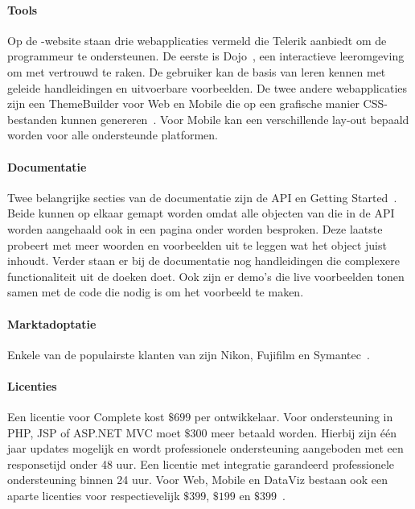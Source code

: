 \paragraph{Tools}
Op de \kendo{}-website staan drie webapplicaties vermeld die Telerik aanbiedt om de programmeur te ondersteunen.
De eerste is \kendo{} Dojo~\cite{Telerika},  een interactieve leeromgeving om met \kendo{} vertrouwd te raken.
De gebruiker kan de basis van \kendo{} leren kennen met geleide handleidingen en uitvoerbare voorbeelden.
De twee andere webapplicaties zijn een ThemeBuilder voor Web en Mobile die op een grafische manier CSS-bestanden kunnen genereren~\cite{Telerikb,Telerikc}.
Voor \kendo{} Mobile kan een verschillende lay-out bepaald worden voor alle ondersteunde platformen.

\paragraph{Documentatie}
Twee belangrijke secties van de documentatie zijn de API en Getting Started~\cite{Telerikd}.
Beide kunnen op elkaar gemapt worden omdat alle objecten van \kendo{} die in de API worden aangehaald ook in een pagina onder  worden besproken.
Deze laatste probeert met meer woorden en voorbeelden uit te leggen wat het object juist inhoudt.
Verder staan er bij de documentatie nog handleidingen die complexere functionaliteit uit de doeken doet.
Ook zijn er demo's die live voorbeelden tonen samen met de code die nodig is om het voorbeeld te maken.

\paragraph{Marktadoptatie}
Enkele van de populairste klanten van \kendo{} zijn Nikon,  Fujifilm en Symantec~\cite{Telerike}.

\paragraph{Licenties}
Een licentie voor \kendo{} Complete kost $\$699$ per ontwikkelaar.
Voor  ondersteuning in PHP,  JSP of ASP.NET MVC moet $\$300$ meer betaald worden.
Hierbij zijn één jaar updates mogelijk en wordt professionele ondersteuning aangeboden met een responsetijd onder 48 uur.
Een licentie met  integratie garandeerd professionele ondersteuning binnen 24 uur.
Voor \kendo{} Web,  Mobile en DataViz bestaan ook een aparte licenties voor respectievelijk $\$399$,  $\$199$ en $\$399$~\cite{Telerik}.

